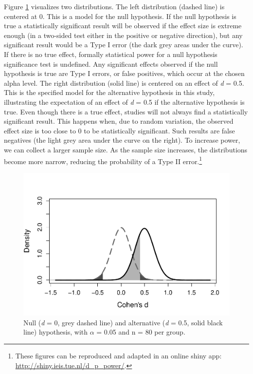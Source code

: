 \documentclass[
  english,
  ,jou,floatsintext]{apa6}
\begin{document}
Figure \ref{fig:power-3} visualizes two distributions. The left distribution (dashed line) is centered at 0. This is a model for the null hypothesis. If the null hypothesis is true a statistically significant result will be observed if the effect size is extreme enough (in a two-sided test either in the positive or negative direction), but any significant result would be a Type I error (the dark grey areas under the curve). If there is no true effect, formally statistical power for a null hypothesis significance test is undefined. Any significant effects observed if the null hypothesis is true are Type I errors, or false positives, which occur at the chosen alpha level. The right distribution (solid line) is centered on an effect of \emph{d} = 0.5. This is the specified model for the alternative hypothesis in this study, illustrating the expectation of an effect of \emph{d} = 0.5 if the alternative hypothesis is true. Even though there is a true effect, studies will not always find a statistically significant result. This happens when, due to random variation, the observed effect size is too close to 0 to be statistically significant. Such results are false negatives (the light grey area under the curve on the right). To increase power, we can collect a larger sample size. As the sample size increases, the distributions become more narrow, reducing the probability of a Type II error.\footnote{These figures can be reproduced and adapted in an online shiny app: \url{http://shiny.ieis.tue.nl/d_p_power/}.}

\begin{figure}
\centering
\includegraphics{sample_size_justification_files/figure-latex/power-3-1.pdf}
\caption{\label{fig:power-3}Null (\emph{d} = 0, grey dashed line) and alternative (\emph{d} = 0.5, solid black line) hypothesis, with \(\alpha\) = 0.05 and n = 80 per group.}
\end{figure}
\end{document}
